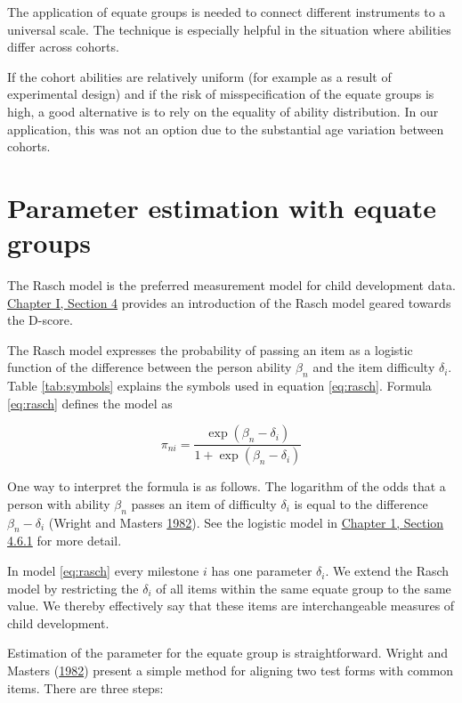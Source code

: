 \documentclass[
]{book}
\begin{document}
The application of equate groups is needed to connect different instruments to a universal scale. The technique is especially helpful in the situation where abilities differ across cohorts.

If the cohort abilities are relatively uniform (for example as a result of experimental design) and if the risk of misspecification of the equate groups is high, a good alternative is to rely on the equality of ability distribution. In our application, this was not an option due to the substantial age variation between cohorts.

\hypertarget{sec:statisticalframe}{%
\section{Parameter estimation with equate groups}\label{sec:statisticalframe}}

The Rasch model is the preferred measurement model for child development data. \href{https://d-score.org/dbook1/ch-newmodel.html}{Chapter I, Section 4} provides an introduction of the Rasch model geared towards the D-score.

The Rasch model expresses the probability of passing an item as a logistic function of the difference between the person ability \(\beta_n\) and the item difficulty \(\delta_i\). Table \ref{tab:symbols} explains the symbols used in equation \eqref{eq:rasch}. Formula \eqref{eq:rasch} defines the model as

\begin{equation}
\pi_{ni} = \frac{\exp(\beta_n - \delta_i)}{1+\exp(\beta_n -\delta_i)} \label{eq:rasch}
\end{equation}

One way to interpret the formula is as follows. The logarithm of the odds that a person with ability \(\beta_n\) passes an item of difficulty \(\delta_i\) is equal to the difference \(\beta_n-\delta_i\) (Wright and Masters \protect\hyperlink{ref-wright1982}{1982}). See the logistic model in \href{https://d-score.org/dbook1/sec-itemresponsefunctions.html\#logistic-model}{Chapter 1, Section 4.6.1} for more detail.

In model \eqref{eq:rasch} every milestone \(i\) has one parameter \(\delta_i\). We extend the Rasch model by restricting the \(\delta_i\) of all items within the same equate group to the same value. We thereby effectively say that these items are interchangeable measures of child development.

Estimation of the parameter for the equate group is straightforward. Wright and Masters (\protect\hyperlink{ref-wright1982}{1982}) present a simple method for aligning two test forms with common items. There are three steps:
\end{document}
